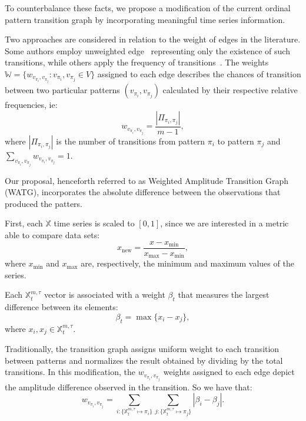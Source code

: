 \documentclass{isprs}
\begin{document}
To counterbalance these facts, we propose a modification of the current ordinal pattern transition graph by incorporating meaningful time series information.

Two approaches are considered in relation to the weight of edges in the literature.
Some authors employ unweighted edge~\citep{McCullough2015lagged, Kulp2016ordinal} representing only the existence of such transitions, while others apply the frequency of transitions~\citep{Sorrentino2015periodic, Zhang2017ConstructingOP}.
The weights $\mathbb{W} = \{w_{v_{\pi_i}, v_{\pi_j}}: v_{\pi_i}, v_{\pi_j} \in V \}$ assigned to each edge describes the chances of transition between two particular patterns $(v_{\pi_i}, v_{\pi_j})$ calculated by their respective relative frequencies, ie:	
\begin{equation}
w_{v_{\pi_i}, v_{\pi_j}} = \frac{|\Pi_{\pi_i,\pi_j}|}{m-1},
\end{equation}
where $|\Pi_{\pi_i,\pi_j}|$ is the number of transitions from pattern $\pi_i$ to pattern $\pi_j$ and $\sum_{v_{\pi_i}, v_{\pi_j}}w_{v_{\pi_i}, v_{\pi_j}} = 1$.

Our proposal, henceforth referred to as Weighted Amplitude Transition Graph (WATG), incorporates the absolute difference between the observations that produced the patters.

First, each $\mathbb{X}$ time series is scaled to $[0, 1]$, since we are interested in a metric able to compare data sets:
\begin{equation}
x_{\text{new}} = \frac{x - x_{\min}}{x_{\max} - x_{\min}},
\end{equation}
where $x_{\min}$ and $x_{\max}$ are, respectively, the minimum and maximum values of the series.

Each $\mathbb{X}^{m, \tau}_t$ vector is associated with a weight $\beta_t$ that measures the largest difference between its elements:
\begin{equation}
\beta_t = \max\{x_i - x_j\},
\end{equation}
where $x_i, x_j \in \mathbb{X}^{m, \tau}_t$.

Traditionally, the transition graph assigns uniform weight to each transition between patterns and normalizes the result obtained by dividing by the total transitions.
In this modification, the $w_{v_{\pi_i}, v_{\pi_j}}$ weights assigned to each edge depict the amplitude difference observed in the transition.
So we have that:	
\begin{equation}
w_{v_{\pi_i}, v_{\pi_j}} =  \sum_{i : \{\mathbb{X}^{m,\tau}_t \mapsto \pi_i\}} \sum_{j : \{\mathbb{X}^{m,\tau}_t \mapsto \pi_j\}} |\beta_i - \beta_j| .
\end{equation}
\end{document}
